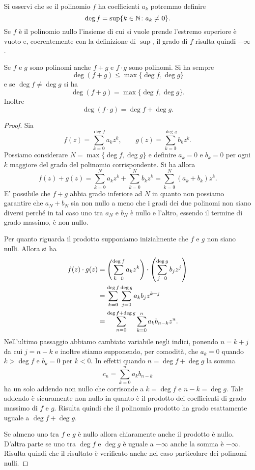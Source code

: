 Si osservi che se il polinomio $f$ ha coefficienti $a_k$ potremmo definire
\[
  \deg f = \sup \{k\in \mathbb N \colon a_k \neq 0\}.
\]
Se $f$ è il polinomio nullo l'insieme di cui si vuole prende l'estremo superiore è vuoto e, coerentemente con la definizione di $\sup$, il grado di $f$ risulta quindi $-\infty$.

\begin{theorem}
Se $f$ e $g$ sono polinomi anche $f+g$ e $f\cdot g$ sono polinomi.
Si ha sempre
\[
\deg (f+g) \le \max\{\deg f, \deg g\}
\]
e se $\deg f \neq \deg g$ si ha
\[
\deg (f+g) = \max\{\deg f, \deg g\}.
\]
Inoltre
\[
 \deg (f\cdot g) = \deg f + \deg g.
\]
\end{theorem}
%
\begin{proof}
Sia
\[
  f(z) = \sum_{k=0}^{\deg f} a_k z^k, \qquad g(z) = \sum_{k=0}^{\deg g} b_k z^k.
\]
Possiamo considerare $N=\max\{\deg f, \deg g\}$ e definire $a_k=0$ e $b_k=0$ per ogni $k$ maggiore del grado del polinomio corrispondente. Si ha allora
\[
  f(z) + g(z) = \sum_{k=0}^N a_k z^k + \sum_{k=0}^N b_k z^k
    = \sum_{k=0}^N (a_k + b_k) z^k.
\]
E' possibile che $f+g$ abbia grado inferiore ad $N$ in quanto non possiamo garantire che $a_N+b_N$ sia non nullo a meno che i gradi dei due polinomi non siano diversi perché in tal caso uno tra $a_N$ e $b_N$ è nullo e l'altro, essendo il termine di grado massimo, è non nullo.

Per quanto riguarda il prodotto supponiamo inizialmente che $f$ e $g$ non siano nulli. Allora si ha
\begin{align*}
 f(z) \cdot g(z)
 &= {\left( \sum_{k=0}^{\deg f} a_k z^k \right)} \cdot {\left( \sum_{j=0}^{\deg g} b_j z^j \right)}\\
 &= \sum_{k=0}^{\deg f} \sum_{j=0}^{\deg g} a_k b_j z^{k+j} \\
 &= \sum_{n=0}^{\deg f + \deg g} \sum_{k=0}^n a_k b_{n-k} z^n.
\end{align*}
Nell'ultimo passaggio abbiamo cambiato variabile negli indici, ponendo $n=k+j$ da cui $j=n-k$ e inoltre stiamo supponendo, per comodità, che $a_k=0$ quando $k>\deg f$ e $b_k = 0$ per $k<0$.
In effetti quando $n= \deg f + \deg g$ la somma
\[
  c_n = \sum_{k=0}^n a_k b_{n-k}
\]
ha un solo addendo non nullo che corrisonde a $k=\deg f$ e $n-k=\deg g$.
Tale addendo è sicuramente non nullo in quanto è il prodotto dei coefficienti di grado massimo di $f$ e $g$. Risulta quindi che il polinomio prodotto ha grado esattamente uguale a $\deg f + \deg g$.

Se almeno uno tra $f$ e $g$ è nullo allora chiaramente anche il prodotto è nullo. D'altra parte se uno tra $\deg f$ e $\deg g$ è uguale a $-\infty$ anche la somma è $-\infty$. Risulta quindi che il risultato è verificato anche nel caso particolare dei polinomi nulli.
\end{proof}

